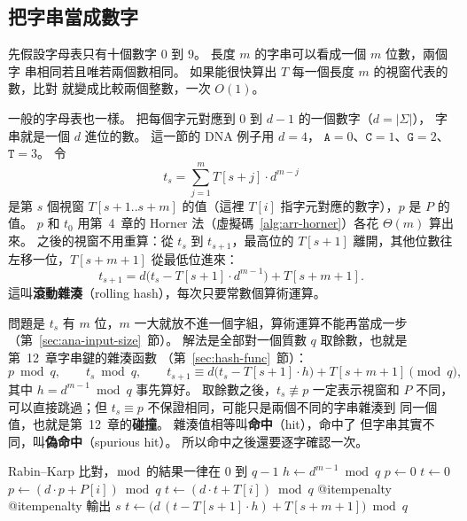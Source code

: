 \subsection{把字串當成數字}

先假設字母表只有十個數字 $0$ 到 $9$。 長度 $m$ 的字串可以看成一個 $m$ 位數，兩個字
串相同若且唯若兩個數相同。 如果能很快算出 $T$ 每一個長度 $m$ 的視窗代表的數，比對
就變成比較兩個整數，一次 $O(1)$。

一般的字母表也一樣。 把每個字元對應到 $0$ 到 $d - 1$ 的一個數字（$d = |\Sigma|$），
字串就是一個 $d$ 進位的數。 這一節的 DNA 例子用 $d = 4$，
$\mathtt{A} = 0$、$\mathtt{C} = 1$、$\mathtt{G} = 2$、$\mathtt{T} = 3$。 令
\[
t_s = \sum_{j=1}^{m} T[s + j] \cdot d^{m-j}
\]
是第 $s$ 個視窗 $T[s + 1 .. s + m]$ 的值（這裡 $T[i]$ 指字元對應的數字），$p$ 是
$P$ 的值。 $p$ 和 $t_0$ 用第~4~章的 Horner 法（虛擬碼~\ref{alg:arr-horner}）各花
$\Theta(m)$ 算出來。 之後的視窗不用重算：從 $t_s$ 到 $t_{s+1}$，最高位的
$T[s + 1]$ 離開，其他位數往左移一位，$T[s + m + 1]$ 從最低位進來：
\begin{equation}
t_{s+1} = d \bigl( t_s - T[s + 1] \cdot d^{m-1} \bigr) + T[s + m + 1].
\label{eq:stm-roll}
\end{equation}
這叫\textbf{滾動雜湊}（rolling hash），每次只要常數個算術運算。

問題是 $t_s$ 有 $m$ 位，$m$ 一大就放不進一個字組，算術運算不能再當成一步
（第~\ref{sec:ana-input-size}~節）。 解法是全部對一個質數 $q$ 取餘數，也就是第~12~章字串鍵的雜湊函數
（第~\ref{sec:hash-func}~節）：
\[
p \bmod q, \qquad t_s \bmod q, \qquad
t_{s+1} \equiv d \bigl( t_s - T[s + 1] \cdot h \bigr) + T[s + m + 1] \pmod q,
\]
其中 $h = d^{m-1} \bmod q$ 事先算好。 取餘數之後，$t_s \not\equiv p$ 一定表示視窗和
$P$ 不同，可以直接跳過；但 $t_s \equiv p$ 不保證相同，可能只是兩個不同的字串雜湊到
同一個值，也就是第~12~章的\textbf{碰撞}。 雜湊值相等叫\textbf{命中}（hit），命中了
但字串其實不同，叫\textbf{偽命中}（spurious hit）。 所以命中之後還要逐字確認一次。

\begin{pseudo}[label=alg:stm-rk, before upper={\csname @itempenalty\endcsname=10000\relax}]{Rabin--Karp 比對，$\bmod$ 的結果一律在 $0$ 到 $q - 1$}
    \State $h \gets d^{m-1} \bmod q$
    \State $p \gets 0$
    \State $t \gets 0$
     
        \State $p \gets (d \cdot p + P[i]) \bmod q$
        \State $t \gets (d \cdot t + T[i]) \bmod q$
    \EndFor
    \csname @itempenalty\relax %
     \csname @itempenalty\relax
         
             
                \State 輸出 $s$
            \EndIf
        \EndIf
            \State $t \gets \bigl( d \, (t - T[s + 1] \cdot h) + T[s + m + 1] \bigr) \bmod q$
        \EndIf
    \EndFor
\EndProcedure
\end{pseudo}

